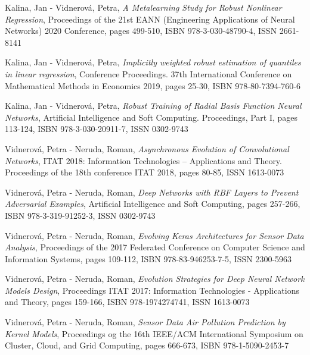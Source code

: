\vspace{0.4em}
\noindent
Kalina, Jan - Vidnerová, Petra, {\em A Metalearning Study for Robust Nonlinear Regression}, Proceedings of the 21st EANN (Engineering Applications of Neural Networks) 2020 Conference, pages 499-510, ISBN 978-3-030-48790-4, ISSN 2661-8141

\vspace{0.4em}
\noindent
Kalina, Jan - Vidnerová, Petra, {\em Implicitly weighted robust estimation of quantiles in linear regression}, Conference Proceedings. 37th International Conference on Mathematical Methods in Economics 2019, pages 25-30, ISBN 978-80-7394-760-6

\vspace{0.4em}
\noindent
Kalina, Jan - Vidnerová, Petra, {\em Robust Training of Radial Basis Function Neural Networks}, Artificial Intelligence and Soft Computing. Proceedings, Part I, pages 113-124, ISBN 978-3-030-20911-7, ISSN 0302-9743

\vspace{0.4em}
\noindent
Vidnerová, Petra - Neruda, Roman, {\em Asynchronous Evolution of Convolutional Networks}, ITAT 2018: Information Technologies – Applications and Theory. Proceedings of the 18th conference ITAT 2018, pages 80-85, ISSN 1613-0073

\vspace{0.4em}
\noindent
Vidnerová, Petra - Neruda, Roman, {\em Deep Networks with RBF Layers to Prevent Adversarial Examples}, Artificial Intelligence and Soft Computing, pages 257-266, ISBN 978-3-319-91252-3, ISSN 0302-9743

\vspace{0.4em}
\noindent
Vidnerová, Petra - Neruda, Roman, {\em Evolving Keras Architectures for Sensor Data Analysis}, Proceedings of the 2017 Federated Conference on Computer Science and Information Systems, pages 109-112, ISBN 978-83-946253-7-5, ISSN 2300-5963

\vspace{0.4em}
\noindent
Vidnerová, Petra - Neruda, Roman, {\em Evolution Strategies for Deep Neural Network Models Design}, Proceedings ITAT 2017: Information Technologies - Applications and Theory, pages 159-166, ISBN 978-1974274741, ISSN 1613-0073

\vspace{0.4em}
\noindent
Vidnerová, Petra - Neruda, Roman, {\em Sensor Data Air Pollution Prediction by Kernel Models}, Proceedings og the 16th IEEE/ACM International Symposium on Cluster, Cloud, and Grid Computing, pages 666-673, ISBN 978-1-5090-2453-7

